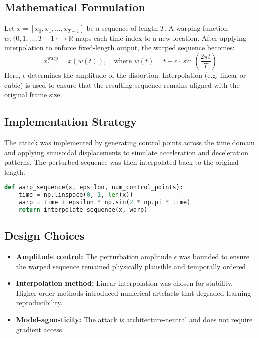 \subsection*{Mathematical Formulation}
Let $x = [x_0, x_1, \dots, x_{T-1}]$ be a sequence of length $T$. A warping function $w: \{0, 1, \dots, T-1\} \to \mathbb{R}$ maps each time index to a new location. After applying interpolation to enforce fixed-length output, the warped sequence becomes:
\[
x^{\text{warp}}_t = x(w(t)), \quad \text{where } w(t) = t + \epsilon \cdot \sin\left( \frac{2\pi t}{T} \right)
\]
Here, $\epsilon$ determines the amplitude of the distortion. Interpolation (e.g. linear or cubic) is used to ensure that the resulting sequence remains aligned with the original frame size.

\subsection*{Implementation Strategy}
The attack was implemented by generating control points across the time domain and applying sinusoidal displacements to simulate acceleration and deceleration patterns. The perturbed sequence was then interpolated back to the original length.

\begin{lstlisting}[language=Python, caption={Example Time-Warping Attack Function}]
def warp_sequence(x, epsilon, num_control_points):
    time = np.linspace(0, 1, len(x))
    warp = time + epsilon * np.sin(2 * np.pi * time)
    return interpolate_sequence(x, warp)
\end{lstlisting}

\subsection*{Design Choices}
\begin{itemize}
    \item \textbf{Amplitude control:} The perturbation amplitude $\epsilon$ was bounded to ensure the warped sequence remained physically plausible and temporally ordered.
    \item \textbf{Interpolation method:} Linear interpolation was chosen for stability. Higher-order methods introduced numerical artefacts that degraded learning reproducibility.
    \item \textbf{Model-agnosticity:} The attack is architecture-neutral and does not require gradient access.
\end{itemize}


